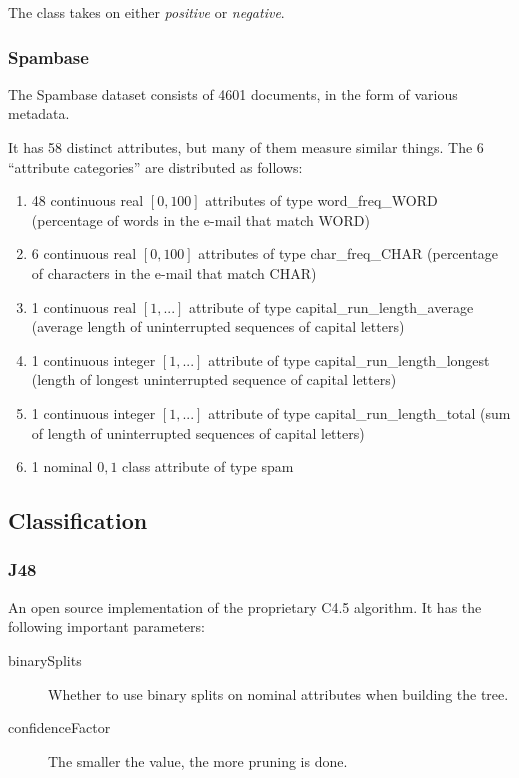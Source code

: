 \documentclass[11pt,a4paper]{article}
\begin{document}
The class takes on either \emph{positive} or \emph{negative}.

\subsubsection*{Spambase}

The Spambase dataset consists of 4601 documents, in the form of various metadata.

It has 58 distinct attributes, but many of them measure similar things. The 6 ``attribute categories'' are distributed as follows:

\begin{enumerate}
  \item 48 continuous real $[0,100]$ attributes of type word\_freq\_WORD (percentage of words in the e-mail that match WORD)
  \item 6 continuous real $[0,100]$ attributes of type char\_freq\_CHAR (percentage of characters in the e-mail that match CHAR)
  \item 1 continuous real $[1,...]$ attribute of type capital\_run\_length\_average (average length of uninterrupted sequences of capital letters)
  \item 1 continuous integer $[1,...]$ attribute of type capital\_run\_length\_longest (length of longest uninterrupted sequence of capital letters)
  \item 1 continuous integer $[1,...]$ attribute of type capital\_run\_length\_total (sum of length of uninterrupted sequences of capital letters)
  \item 1 nominal ${0,1}$ class attribute of type spam
\end{enumerate}


\subsection{Classification} %
\label{sub:classification}

\subsubsection*{J48}

An open source implementation of the proprietary C4.5 algorithm. It has the following important parameters:

\begin{description}
  \item[binarySplits] Whether to use binary splits on nominal attributes when building the tree.
  \item[confidenceFactor] The smaller the value, the more pruning is done.
\end{description}
\end{document}
